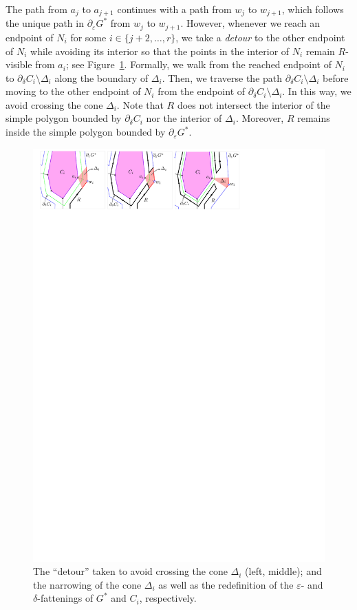 \documentclass[11pt]{patmorin}
\begin{document}
The path from $a_j$ to $a_{j+1}$ continues with a path from $w_j$ to $w_{j+1}$, which follows the unique path in $\partial_\varepsilon G^*$ from $w_j$ to $w_{j+1}$. However, whenever we reach an endpoint of $N_i$ for some $i\in \{j+2,\dots,r\}$, we take a \emph{detour} to the other endpoint of $N_i$ while avoiding its interior so that the points in the interior of $N_i$ remain $R$-visible from $a_i$; see Figure~\ref{fig:Skip Component}. Formally, we walk from the reached endpoint of $N_i$ to $\partial_\delta C_i\setminus \Delta_i$ along the boundary of $\Delta_i$. Then, we traverse the path $\partial_\delta C_i\setminus \Delta_i$ before moving to the other endpoint of $N_i$ from the endpoint of $\partial_\delta C_i \setminus \Delta_i$. In this way, we avoid crossing the cone $\Delta_i$. Note that $R$ does not intersect the interior of the simple polygon bounded by $\partial_\delta C_i$ nor the interior of $\Delta_i$. Moreover, $R$ remains inside the simple polygon bounded by $\partial_\varepsilon G^*$.


\begin{figure}[tb]
\centering
\includegraphics[width=.98\textwidth]{img/SkipComponent.pdf}
\caption{The ``detour'' taken to avoid crossing the cone $\Delta_i$ (left, middle); and the narrowing of the cone $\Delta_i$ as well as the redefinition of the $\varepsilon$- and $\delta$-fattenings of $G^*$ and $C_i$, respectively.}
\label{fig:Skip Component}
\end{figure}
\end{document}
